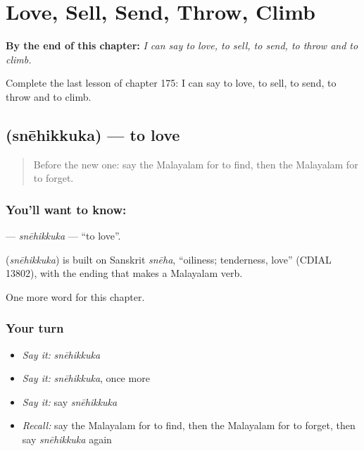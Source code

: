 
\chapter{Love, Sell, Send, Throw, Climb}
\label{ch:ml-love-sell-send-throw-climb}

\begin{chapteropening}
\textbf{By the end of this chapter:} \emph{I can say to love, to sell, to send, to throw and to climb.}

Complete the last lesson of chapter 175: I can say to love, to sell, to send, to throw and to climb.
\end{chapteropening}

\section[\texorpdfstring{\ml{സ്നേഹിക്കുക} (snēhikkuka)}{സ്നേഹിക്കുക (snēhikkuka)}]{ (snēhikkuka) — to love}

\label{lesson:ML-C175-snehikkuka}



\begin{quote}
Before the new one: say the Malayalam for to find, then the Malayalam for to forget.
\end{quote}

\subsection*{You'll want to know: }
\textbf{} — \emph{snēhikkuka} — \textquotedblleft{}to love\textquotedblright{}.

\begin{cousinweb}
\textbf{} (\emph{snēhikkuka}) is built on Sanskrit \emph{snēha}, \textquotedblleft{}oiliness; tenderness, love\textquotedblright{} (CDIAL 13802), with the ending that makes a Malayalam verb.
\end{cousinweb}

\begin{grammarlens}[title={What you've built}]
One more word for this chapter.
\end{grammarlens}

\subsection*{Your turn}
\begin{itemize}
\raggedright
  \item \emph{Say it:} \emph{snēhikkuka}
  \item \emph{Say it:} \emph{snēhikkuka}, once more
  \item \emph{Say it:} say \emph{snēhikkuka}
  \item \emph{Recall:} say the Malayalam for to find, then the Malayalam for to forget, then say \emph{snēhikkuka} again
\end{itemize}

